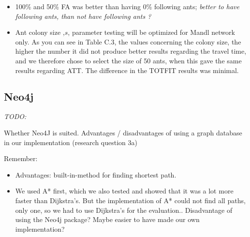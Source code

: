 \begin{itemize}
\item 100\% and 50\% FA was better than having 0\% following ants; \emph{\color{blue}better to have following ants, than not have following ants ?}
\item Ant colony size ,$s$, parameter testing will be optimized for Mandl network only. As you can see in Table C.3, the values concerning the colony size, the higher the number it did not produce better results regarding the travel time, and we therefore chose to select the size of 50 ants, when this gave the same results regarding ATT. The difference in the TOTFIT results was minimal.
\end{itemize}

\subsection{Neo4j}

\emph{\color{blue} TODO:}

Whether Neo4J is suited. Advantages / disadvantages of using a graph database in our implementation (research question 3a)

Remember:
\begin{itemize}
\item Advantages: built-in-method for finding shortest path.
\item We used A* first, which we also tested and showed that it was a lot more faster than Dijkstra's. But the implementation of A* could not find all paths, only one, so we had to use Dijkstra's for the evaluation.. Disadvantage of using the Neo4j package? Maybe easier to have made our own implementation?
\end{itemize}

